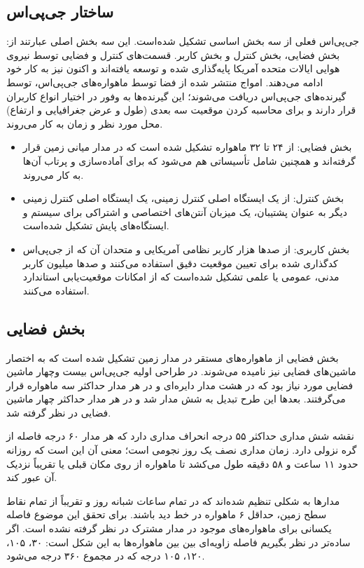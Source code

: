 \subsection{ساختار جی‌پی‌اس}
جی‌پی‌اس فعلی از سه بخش اساسی تشکیل شده‌است. این سه بخش اصلی عبارتند از: بخش فضایی، بخش کنترل و بخش کاربر. قسمت‌های کنترل و فضایی توسط نیروی هوایی ایالات متحده آمریکا پایه‌گذاری شده و توسعه یافته‌اند و اکنون نیز به کار خود ادامه می‌دهند. امواج منتشر شده از فضا توسط ماهواره‌های جی‌پی‌اس، توسط گیرنده‌های جی‌پی‌اس دریافت می‌شوند؛ این گیرنده‌ها به وفور در اختیار انواع کاربران قرار دارند و برای محاسبه کردن موقعیت سه بعدی (طول و عرض جغرافیایی و ارتفاع) محل مورد نظر و زمان به کار می‌روند.
\begin{itemize}
	\item
	بخش فضایی: از ۲۴ تا ۳۲ ماهواره تشکیل شده‌ است که در مدار میانی زمین قرار گرفته‌اند و همچنین شامل تأسیساتی هم می‌شود که برای آماده‌سازی و پرتاب آن‌ها به کار می‌روند.
	\item 
	
	بخش کنترل: از یک ایستگاه اصلی کنترل زمینی، یک ایستگاه اصلی کنترل زمینی دیگر به عنوان پشتیبان، یک میزبان آنتن‌های اختصاصی و اشتراکی برای سیستم و ایستگاه‌های پایش تشکیل شده‌است.
	
	\item  
	بخش کاربری: از صدها هزار کاربر نظامی آمریکایی و متحدان آن که از جی‌پی‌اس کدگذاری شده برای تعیین موقعیت دقیق استفاده می‌کنند و صدها میلیون کاربر مدنی، عمومی یا علمی تشکیل شده‌است که از امکانات موقعیت‌یابی استاندارد استفاده می‌کنند.
\end{itemize}
\subsection{بخش فضایی}
بخش فضایی از ماهواره‌های مستقر در مدار زمین تشکیل شده ‌است که به اختصار ماشین‌های فضایی نیز نامیده می‌شوند. در طراحی اولیه جی‌پی‌اس بیست وچهار ماشین فضایی مورد نیاز بود که در هشت  مدار دایره‌ای و در هر مدار حداکثر سه ماهواره قرار می‌گرفتند. بعدها این طرح تبدیل به شش مدار شد و در هر مدار حداکثر چهار ماشین فضایی در نظر گرفته شد.


نقشه شش مداری حداکثر ۵۵ درجه انحراف مداری دارد که هر مدار ۶۰ درجه فاصله از گره نزولی دارد. زمان مداری نصف یک روز نجومی است؛ معنی آن این است که روزانه حدود ۱۱ ساعت و ۵۸ دقیقه طول می‌کشد تا ماهواره از روی مکان قبلی یا تقریباً نزدیک آن عبور کند.


مدارها به شکلی تنظیم شده‌اند که در تمام ساعات شبانه روز و تقریباً از تمام نقاط سطح زمین، حداقل ۶ ماهواره در خط دید باشند. برای تحقق این موضوع فاصله یکسانی برای ماهواره‌های موجود در مدار مشترک در نظر گرفته نشده‌ است. اگر ساده‌تر در نظر بگیریم فاصله زاویه‌ای بین بین ماهواره‌ها به این شکل است: ۳۰،  ۱۰۵،  ۱۲۰،  ۱۰۵ درجه که در مجموع ۳۶۰ درجه می‌شود.


